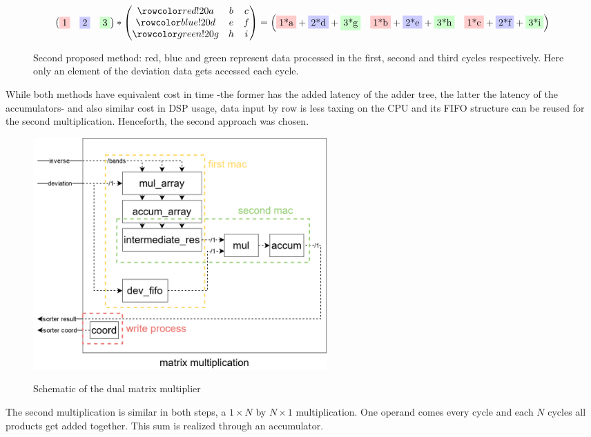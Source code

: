 \begin{figure}[h]%
\[
\begin{pmatrix}
\rb1 & \bb 2 & \gb 3
\end{pmatrix}
*
\begin{pmatrix}
\rr a & b & c \\ 
\br d & e & f \\ 
\gr g & h & i
\end{pmatrix}
=
\begin{pmatrix}
\rb{1*a}+\bb{2*d}+\gb{3*g} & \rb{1*b}+\bb{2*e}+\gb{3*h} & \rb{1*c}+\bb{2*f}+\gb{3*i}
\end{pmatrix} 
\]
\caption[Optional: Short caption to appear in List of Figures]{Second proposed method: red, blue and green represent data processed in the first, second and third cycles respectively. Here only an element of the deviation data gets accessed each cycle.}
\end{figure}

While both methods have equivalent cost in time -the former has the added latency of the adder tree, the latter the latency of the accumulators- and also similar cost in DSP usage, data input by row is less taxing on the CPU and its FIFO structure can be reused for the second multiplication. Henceforth, the second approach was chosen.

\pagebreak

\begin{figure}[h!]
\centering\textbf{
\includegraphics[height=3.5in]{figures/mult.png}}
\caption{Schematic of the dual matrix multiplier}
  \label{fig:mult}
\end{figure}

The second multiplication is similar in both steps, a \(1 \times N\) by \(N \times 1\) multiplication. One operand comes every cycle and each \(N\) cycles all products get added together. This sum is realized through an accumulator.\\

